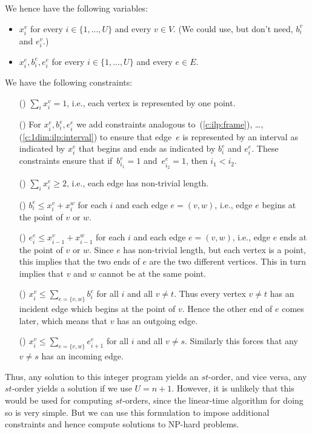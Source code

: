 \documentclass[runningheads]{llncs}
\newcounter{constr}
\newcommand{\constr}[1]{\noindent \refstepcounter{constr}\theconstr #1}
\begin{document}
We hence have the following variables:
\begin{itemize}
\item $x_i^v$ for every $i\in \{1,\dots,U\}$ and every $v\in V$.
	(We could use, but don't need, $b_i^v$ and $e_i^v$.)
\item $x_i^e,b_i^e,e_i^e$ for every $i\in \{1,\dots,U\}$ and every $e\in E$.
\end{itemize}
We have the following constraints:
\begin{itemize}
\item[(\constr{\label{c:1dim:st:1}})]
 $\sum_{i} x_i^v = 1$, i.e., each vertex is represented by one point.
\item[(\constr{\label{c:1dim:st:2}})]
For $x_i^e,b_i^e,e_i^e$ we add constraints analogous to~(\ref{c:ilp:frame}),
\ldots,(\ref{c:1dim:ilp:interval})
to ensure that edge~$e$ is represented
	by an interval as indicated by $x_i^e$ that begins and ends
	as indicated by $b_i^e$ and $e_i^e$.
	These constraints ensure that if~$b_{i_1}^e = 1$ and~$e_{i_2}^e = 1$,
	then $i_1 < i_2$.
\item[(\constr{\label{c:1dim:st:3}})]
 $\sum_i x_i^e \geq 2$, i.e., each edge has non-trivial length.
\item[(\constr{\label{c:1dim:st:4}})]
 $b_i^e\leq x_i^v+x_i^w$ for each $i$ and each edge $e=(v,w)$,
	i.e., edge $e$ begins at the point of $v$ or $w$.
\item[(\constr{\label{c:1dim:st:5}})]
 $e_i^e\leq x_{i-1}^v+x_{i-1}^w$ for each $i$ and each edge $e=(v,w)$,
	i.e., edge $e$ ends at the point of $v$ or $w$.  Since $e$ has
	non-trivial length, but each vertex is a point, this implies
	that the two ends of $e$ are the two different vertices.  This
	in turn implies that $v$ and $w$ cannot be at the same point.
\item[(\constr{\label{c:1dim:st:6}})]
 $x_i^v \leq \sum_{e=\{ v,w\} } b_i^e$ for all $i$ and all $v\neq t$.
	Thus every vertex $v\neq t$ has an incident edge which begins
	at the point of $v$.  Hence the other end of $e$ comes later,
	which means that $v$ has an outgoing edge.
\item[(\constr{\label{c:1dim:st:7}})]
 $x_i^v \leq \sum_{e=\{ v,w\}} e_{i+1}^e$ for all $i$ and all $v\neq s$.
	Similarly this forces that any $v\neq s$ has an incoming edge.
\end{itemize}

Thus, any solution to this integer program yields an $st$-order,
and vice versa, any $st$-order yields a solution if we use $U=n+1$.
However, it is unlikely that this would be used for computing $st$-orders,
since the linear-time algorithm for doing so \cite{ET76} is very
simple.  But we can use this formulation to impose additional
constraints and hence compute solutions to NP-hard problems.
\end{document}
